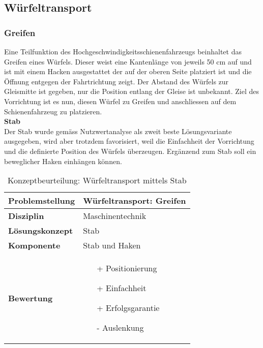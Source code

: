 \documentclass[../../main.tex]{subfiles}
\begin{document}
    \subsection{Würfeltransport}
    \subsubsection{Greifen}
     Eine Teilfunktion des Hochgeschwindigkeitsschienenfahrzeugs beinhaltet das Greifen eines Würfels. Dieser weist eine Kantenlänge von jeweils 50 cm auf und ist mit einem Hacken ausgestattet der auf der oberen Seite platziert ist und die Öffnung entgegen der Fahrtrichtung zeigt. Der Abstand des Würfels zur Gleismitte ist gegeben, nur die Position entlang der Gleise ist unbekannt. Ziel des Vorrichtung ist es nun, diesen Würfel zu Greifen und anschliessen auf dem Schienenfahrzeug zu platzieren.\\

         \textbf{Stab}\\
     Der Stab wurde gemäss Nutzwertanalyse als zweit beste Lösungsvariante ausgegeben, wird aber trotzdem favorisiert, weil die Einfachheit der Vorrichtung und die definierte Position des Würfels überzeugen. Ergänzend zum Stab soll ein beweglicher Haken einhängen können. \\
    \begin{flushleft}
        \begin{table}[h]
        \begin{tabular}{ | l | p{11cm} |}
        \hline
        \textbf{Problemstellung} & Würfeltransport: Greifen \\ \hline
        \textbf{Disziplin} & Maschinentechnik \\ \hline
        \textbf{Lösungskonzept} &  Stab \\ \hline
        \textbf{Komponente} & Stab und Haken \\ \hline
        \textbf{Bewertung} &  \begin{itemize}
                                \item[+] Positionierung
                                \item[+] Einfachheit
                                \item[+] Erfolgsgarantie 
                                \item[-] Auslenkung
                              \end{itemize} \\ \hline
        \end{tabular}
        \caption{Konzeptbeurteilung: Würfeltransport mittels Stab}
        \label{tab:konzept_wurfeltransport_stab}
    \end{table}
    \end{flushleft}
\end{document}
